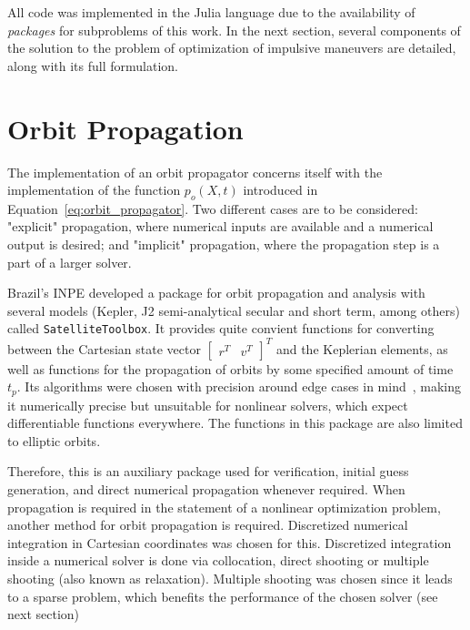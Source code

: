 
All code was implemented in the Julia language due to the availability of \textit{packages} for subproblems of this work. In the next section, several components of the solution to the problem of optimization of impulsive maneuvers are detailed, along with its full formulation.

\section{Orbit Propagation}\label{sec:orbit_propagation}

The implementation of an orbit propagator concerns itself with the implementation of the function \(p_o(X, t)\) introduced in Equation~\eqref{eq:orbit_propagator}. Two different cases are to be considered: "explicit" propagation, where numerical inputs are available and a numerical output is desired; and "implicit" propagation, where the propagation step is a part of a larger solver.

Brazil's INPE developed a package for orbit propagation and analysis with several models (Kepler, J2 semi-analytical secular and short term, among others) called \texttt{SatelliteToolbox}. It provides quite convient functions for converting between the Cartesian state vector \(\begin{bmatrix}
    r^T & v^T
\end{bmatrix}^T\) and the Keplerian elements, as well as functions for the propagation of orbits by some specified amount of time \(t_p\). Its algorithms were chosen with precision around edge cases in mind~\cite{rv_to_kepler}, making it numerically precise but unsuitable for nonlinear solvers, which expect differentiable functions everywhere. The functions in this package are also limited to elliptic orbits.

Therefore, this is an auxiliary package used for verification, initial guess generation, and direct numerical propagation whenever required. When propagation is required in the statement of a nonlinear optimization problem, another method for orbit propagation is required. Discretized numerical integration in Cartesian coordinates was chosen for this. Discretized integration inside a numerical solver is done via collocation, direct shooting or multiple shooting (also known as relaxation). Multiple shooting was chosen since it leads to a sparse problem, which benefits the performance of the chosen solver (see next section)

